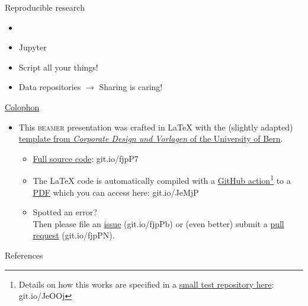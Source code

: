 \documentclass[aspectratio=169,10pt]{beamer}
\begin{document}
\begin{frame}{Reproducible research}
	\begin{itemize}
		\item \faGit%
		\item Jupyter
		\item Script all your things!
		\item Data repositories \(\rightarrow\) Sharing is caring!
	\end{itemize}
\end{frame}

\begin{frame}{\href{https://en.wikipedia.org/wiki/Colophon_(publishing)}{Colophon}}
	\begin{itemize} 
		\item This \textsc{beamer} presentation was crafted in \LaTeX\xspace with the (slightly adapted) \href{http://intern.unibe.ch/dienstleistungen/corporate_design_und_vorlagen/praesentationen/index_ger.html}{template from \emph{Corporate Design und Vorlagen} of the University of Bern}.
		\begin{itemize}
			\item \href{https://github.com/habi/lecture.microtomography/}{Full source code}: git.io/fjpP7
			\item The \LaTeX\xspace code is automatically compiled with a \href{https://github.com/actions}{GitHub action}\footnote{Details on how this works are specified in a \href{https://github.com/habi/latex-test/}{small test repository here}: git.io/JeOOj} to a \href{https://habi.github.io/Lecture.Microtomography/XRayMicroTomography.pdf}{PDF} which you can access here: git.io/JeMjP
			\item Spotted an error?\\%
				Then please file an \href{https://github.com/habi/lecture.microtomography/issues}{issue} (git.io/fjpPb) or (even better) submit a \href{https://github.com/habi/lecture.microtomography/pulls}{pull request} (git.io/fjpPN).
		\end{itemize}
	\end{itemize}
\end{frame}

\begin{frame}{References}
	\printbibliography
\end{frame}
\end{document}
